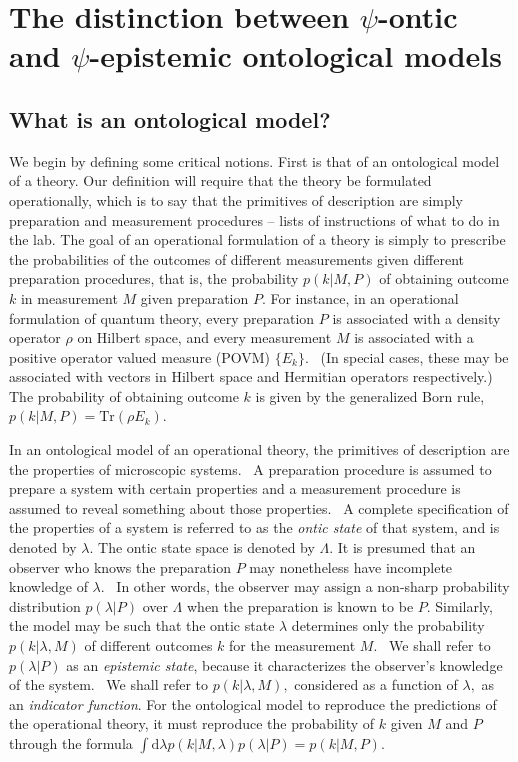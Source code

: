 \documentclass[aps,nofootinbib,12pt]{revtex4}
\begin{document}
\section{The distinction between $\psi$-ontic and $\psi$-epistemic ontological
models}

\subsection{What is an ontological model? \label{SEC:om_intro}}

We begin by defining some critical notions. First is that of an
ontological model of a theory. Our definition will require that the
theory be formulated operationally, which is to say that the
primitives of description are simply preparation and measurement
procedures -- lists of instructions of what to do in the lab. The
goal of an operational formulation of a theory is simply to
prescribe the probabilities of the outcomes of different
measurements given different preparation procedures, that is, the
probability $p(k|M,P)$ of obtaining outcome $k$ in measurement $M$
given preparation $P.$ For instance, in an operational formulation
of quantum theory, every preparation $P$ is associated with a
density operator $\rho$ on Hilbert space, and every measurement $M$
is associated with a positive operator valued measure (POVM)
$\{E_{k}\}$. \ (In special cases, these may be associated with
vectors in Hilbert space and Hermitian operators respectively.) The
probability of obtaining outcome $k$ is given by the generalized
Born rule, $p(k|M,P)=\mathrm{Tr}(\rho E_{k}).$

In an ontological model of an operational theory, the primitives of
description are the properties of microscopic systems. \ A
preparation procedure is assumed to prepare a system with certain
properties and a measurement procedure is assumed to reveal
something about those properties. \ A complete specification of the
properties of a system is referred to as the \emph{ontic state} of
that system, and is denoted by $\lambda$. The ontic state space is
denoted by $\Lambda$. It is presumed that an observer who knows the
preparation $P$ may nonetheless have incomplete knowledge of
$\lambda.$ \ In other words, the observer may assign a non-sharp
probability distribution $p(\lambda|P)$ over $\Lambda$ when the
preparation is known to be $P.$ Similarly, the model may be such
that the ontic state $\lambda$ determines only the probability
$p(k|\lambda,M)$ of different outcomes $k$ for the measurement $M.$
\ We shall refer to $p(\lambda|P)$ as an \emph{epistemic state},
because it characterizes the observer's knowledge of the system. \
We shall refer to $p(k|\lambda,M),$ considered as a function of
$\lambda,$ as an \emph{indicator function}. For the ontological
model to reproduce the predictions of the operational theory, it
must reproduce the probability of $k$ given $M$ and $P$ through the
formula $\int\mathrm{d}\lambda
{p}(k|M,\lambda)p(\lambda|P)=p(k|M,P).$
\end{document}
